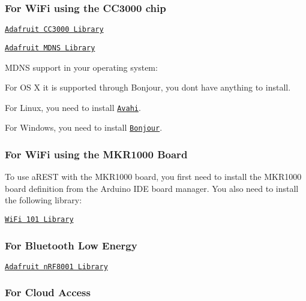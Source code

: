 \subsubsection*{For Wi\+Fi using the C\+C3000 chip}


\begin{DoxyItemize}
\item \href{https://github.com/adafruit/Adafruit_CC3000_Library}{\tt Adafruit C\+C3000 Library}
\item \href{https://github.com/adafruit/CC3000_MDNS}{\tt Adafruit M\+D\+NS Library}
\item M\+D\+NS support in your operating system\+:
\begin{DoxyItemize}
\item For OS X it is supported through Bonjour, you don\textquotesingle{}t have anything to install.
\item For Linux, you need to install \href{http://avahi.org/}{\tt Avahi}.
\item For Windows, you need to install \href{http://www.apple.com/support/bonjour/}{\tt Bonjour}.
\end{DoxyItemize}
\end{DoxyItemize}

\subsubsection*{For Wi\+Fi using the M\+K\+R1000 Board}

To use a\+R\+E\+ST with the M\+K\+R1000 board, you first need to install the M\+K\+R1000 board definition from the Arduino I\+DE board manager. You also need to install the following library\+:


\begin{DoxyItemize}
\item \href{https://github.com/arduino-libraries/WiFi101}{\tt Wi\+Fi 101 Library}
\end{DoxyItemize}

\subsubsection*{For Bluetooth Low Energy}


\begin{DoxyItemize}
\item \href{https://github.com/adafruit/Adafruit_nRF8001}{\tt Adafruit n\+R\+F8001 Library}
\end{DoxyItemize}

\subsubsection*{For Cloud Access}


